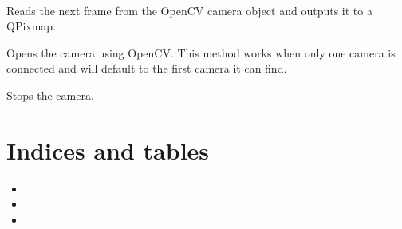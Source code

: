 \documentclass[letterpaper,10pt,english]{sphinxmanual}
\begin{document}
\begin{fulllineitems}
\label{\detokenize{code:mainwindow.UI_Window}}~

\begin{fulllineitems}
\label{\detokenize{code:mainwindow.UI_Window.nextFrameSlot}}
Reads the next frame from the OpenCV camera object and outputs it to a QPixmap.

\end{fulllineitems}


\begin{fulllineitems}
\label{\detokenize{code:mainwindow.UI_Window.openCamera}}
Opens the camera using OpenCV. This method works when only one camera is connected and will default to the first camera it can find.

\end{fulllineitems}


\begin{fulllineitems}
\label{\detokenize{code:mainwindow.UI_Window.stopCamera}}
Stops the camera.

\end{fulllineitems}


\end{fulllineitems}



\chapter{Indices and tables}
\label{\detokenize{index:indices-and-tables}}\begin{itemize}
\item {} 

\item {} 

\item {} 

\end{itemize}


\renewcommand{\indexname}{Python Module Index}
\begin{sphinxtheindex}
\let\bigletter\sphinxstyleindexlettergroup
\bigletter{m}
\item\relax{}
\end{sphinxtheindex}

\renewcommand{\indexname}{Index}
\printindex
\end{document}
